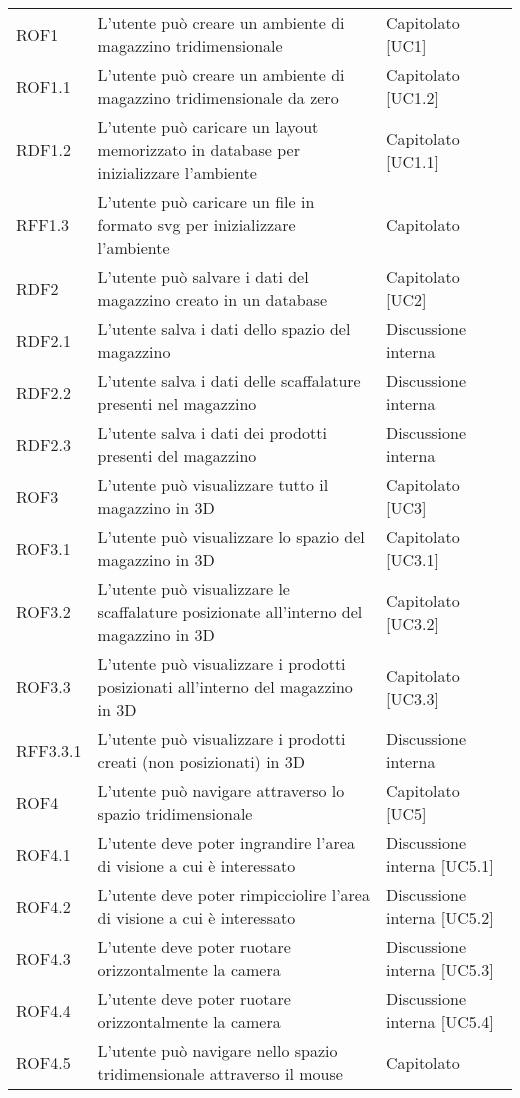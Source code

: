 \begin{xltabular}{\textwidth}{ p{0.2\textwidth} | X | p{0.2\textwidth} }
    ROF1& L'utente può creare un ambiente di magazzino tridimensionale & Capitolato [UC1]\\
    ROF1.1& L'utente può creare un ambiente di magazzino tridimensionale da zero & Capitolato [UC1.2]\\
    RDF1.2& L'utente può caricare un layout memorizzato in database per inizializzare l'ambiente & Capitolato [UC1.1]\\
    RFF1.3& L'utente può caricare un file in formato svg per inizializzare l'ambiente & Capitolato \\
    RDF2& L'utente può salvare i dati del magazzino creato in un database & Capitolato [UC2]  \\
    RDF2.1& L'utente salva i dati dello spazio del magazzino & Discussione interna   \\
    RDF2.2& L'utente salva i dati delle scaffalature presenti nel magazzino & Discussione interna   \\
    RDF2.3& L'utente salva i dati dei prodotti presenti del magazzino & Discussione interna     \\
    ROF3& L'utente può visualizzare tutto il magazzino in 3D & Capitolato [UC3]\\
    ROF3.1& L'utente può visualizzare lo spazio del magazzino in 3D & Capitolato [UC3.1]\\
    ROF3.2& L'utente può visualizzare le scaffalature posizionate all'interno del magazzino in 3D & Capitolato [UC3.2]\\
    ROF3.3& L'utente può visualizzare i prodotti posizionati all'interno del magazzino in 3D & Capitolato [UC3.3]\\
    RFF3.3.1& L'utente può visualizzare i prodotti creati (non posizionati) in 3D & Discussione interna       \\
    ROF4& L'utente può navigare attraverso lo spazio tridimensionale & Capitolato [UC5]\\
    ROF4.1& L'utente deve poter ingrandire l'area di visione a cui è interessato & Discussione interna [UC5.1] \\
    ROF4.2& L'utente deve poter rimpicciolire l'area di visione a cui è interessato & Discussione interna [UC5.2] \\
    ROF4.3& L'utente deve poter ruotare orizzontalmente la camera & Discussione interna [UC5.3] \\
    ROF4.4& L'utente deve poter ruotare orizzontalmente la camera & Discussione interna [UC5.4] \\
    ROF4.5& L'utente può navigare nello spazio tridimensionale attraverso il mouse& Capitolato\\

\end{xltabular}

